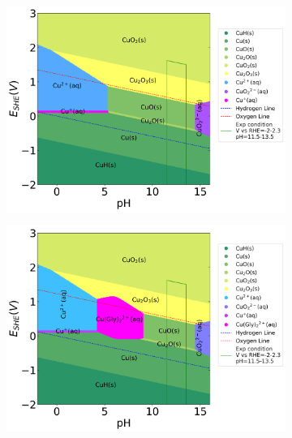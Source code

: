 \documentclass[journal=jacsat,manuscript=article]{achemso}
\begin{document}
\begin{figure}[htbp]
    \centering
    \begin{subfigure}[b]{0.3\textwidth}
        \subcaption{}\label{fig:Cu_Pourbaix_H2O}
        \includegraphics[width=\textwidth]{Figures/pourbaix_diagrams/Cu-NH3-H2O_activity=1e-04_[NH3]=0M_[Gly]=0M_[CN]=0.png}
        \par\medskip
    \end{subfigure}
    \begin{subfigure}[b]{0.3\textwidth}
        \subcaption{}\label{fig:Cu_Pourbaix_NH3_Gly}
        \includegraphics[width=\textwidth]{Figures/pourbaix_diagrams/Cu-NH3-H2O_activity=1e-04_[NH3]=0.02M_[Gly]=0.005M_[CN]=0.png}

\end{subfigure}
\end{figure}
\end{document}
